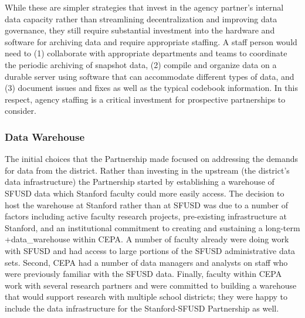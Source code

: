 \documentclass[
]{book}
\begin{document}
While these are simpler strategies that invest in the agency partner's internal data capacity rather than streamlining decentralization and improving data governance, they still require substantial investment into the hardware and software for archiving data and require appropriate staffing. A staff person would need to (1) collaborate with appropriate departments and teams to coordinate the periodic archiving of snapshot data, (2) compile and organize data on a durable server using software that can accommodate different types of data, and (3) document issues and fixes as well as the typical codebook information. In this respect, agency staffing is a critical investment for prospective partnerships to consider.

\hypertarget{data-warehouse}{%
\subsubsection{Data Warehouse}\label{data-warehouse}}

The initial choices that the Partnership made focused on addressing the demands for data from the district. Rather than investing in the upstream (the district's data infrastructure) the Partnership started by establishing a warehouse of SFUSD data which Stanford faculty could more easily access. The decision to host the warehouse at Stanford rather than at SFUSD was due to a number of factors including active faculty research projects, pre-existing infrastructure at Stanford, and an institutional commitment to creating and sustaining a long-term +data\_warehouse\textbar{} within CEPA. A number of faculty already were doing work with SFUSD and had access to large portions of the SFUSD administrative data sets. Second, CEPA had a number of data managers and analysts on staff who were previously familiar with the SFUSD data. Finally, faculty within CEPA work with several research partners and were committed to building a warehouse that would support research with multiple school districts; they were happy to include the data infrastructure for the Stanford-SFUSD Partnership as well.
\end{document}
